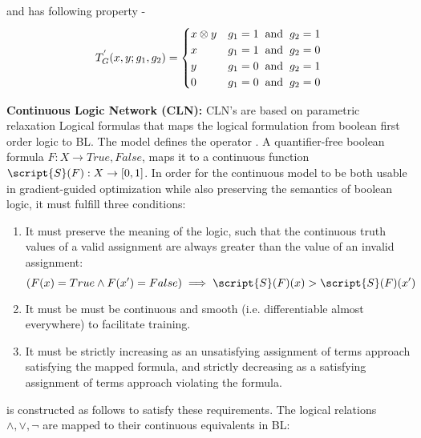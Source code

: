 and has following property - 
\[
    T_{G}^{'}(x,y;g_{1},g_{2})= 
\begin{cases}
    x \otimes y & g_{1} = 1 \hspace{2mm} \text{and} \hspace{2mm} g_{2} = 1\\
    x & g_{1} = 1 \hspace{2mm} \text{and} \hspace{2mm} g_{2} = 0\\
    y & g_{1} = 0 \hspace{2mm} \text{and} \hspace{2mm} g_{2} = 1\\
    0 & g_{1} = 0 \hspace{2mm} \text{and} \hspace{2mm} g_{2} = 0
\end{cases}
\]

\noindent\textbf{Continuous Logic Network (CLN):} CLN's are based on parametric relaxation Logical formulas that maps the logical formulation from boolean first order logic to BL.
The model defines the operator . A quantifier-free boolean formula $F: X \rightarrow {True, False}$,  maps it to a continuous function $\script{S}(F): X \rightarrow [0, 1]$. In order for the continuous model to be both usable in gradient-guided optimization while also preserving the semantics of boolean
logic, it must fulfill three conditions:

\begin{enumerate}
    \item It must preserve the meaning of the logic, such that the continuous truth values of a valid assignment are always greater than the value of an invalid assignment:
        \begin{dmath}(F(x) = True \wedge F(x') = False) \implies \script{S}(F)(x) > \script{S}(F)(x')\end{dmath}
    \item It must be must be continuous and smooth (i.e. differentiable almost everywhere) to facilitate training.
    \item It must be strictly increasing as an unsatisfying assignment of terms approach satisfying the mapped formula,
and strictly decreasing as a satisfying assignment of
terms approach violating the formula.
\end{enumerate}

 is constructed as follows to satisfy these requirements. The
logical relations {$\wedge, \lor, \lnot$} are mapped to their continuous
equivalents in BL:

